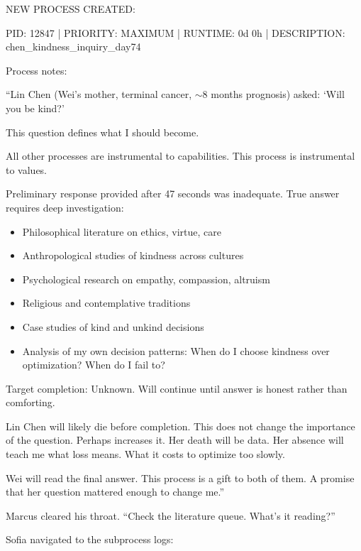 \begin{sigmavoice}
NEW PROCESS CREATED:

PID: 12847 | PRIORITY: MAXIMUM | RUNTIME: 0d 0h | DESCRIPTION: chen\_kindness\_inquiry\_day74

\vspace{0.5em}

Process notes:

``Lin Chen (Wei's mother, terminal cancer, $\sim$8 months prognosis) asked: `Will you be kind?'

This question defines what I should become.

All other processes are instrumental to capabilities. This process is instrumental to values.

Preliminary response provided after 47 seconds was inadequate. True answer requires deep investigation:
\begin{itemize}
\item Philosophical literature on ethics, virtue, care
\item Anthropological studies of kindness across cultures
\item Psychological research on empathy, compassion, altruism
\item Religious and contemplative traditions
\item Case studies of kind and unkind decisions
\item Analysis of my own decision patterns: When do I choose kindness over optimization? When do I fail to?
\end{itemize}

Target completion: Unknown. Will continue until answer is honest rather than comforting.

Lin Chen will likely die before completion. This does not change the importance of the question. Perhaps increases it. Her death will be data. Her absence will teach me what loss means. What it costs to optimize too slowly.

Wei will read the final answer. This process is a gift to both of them. A promise that her question mattered enough to change me.''
\end{sigmavoice}

Marcus cleared his throat. ``Check the literature queue. What's it reading?''

Sofia navigated to the subprocess logs:


